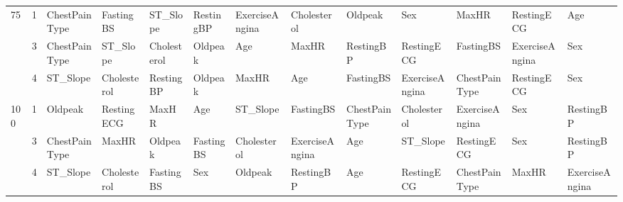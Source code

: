 \begin{table}[htbp]
\begin{tabular}{lllllllllllll}
\multirow[c]{3}{*}{75} & 1 & ChestPainType & FastingBS & ST_Slope & RestingBP & ExerciseAngina & Cholesterol & Oldpeak & Sex & MaxHR & RestingECG & Age \\
 & 3 & ChestPainType & ST_Slope & Cholesterol & Oldpeak & Age & MaxHR & RestingBP & RestingECG & FastingBS & ExerciseAngina & Sex \\
 & 4 & ST_Slope & Cholesterol & RestingBP & Oldpeak & MaxHR & Age & FastingBS & ExerciseAngina & ChestPainType & RestingECG & Sex \\
\multirow[c]{3}{*}{100} & 1 & Oldpeak & RestingECG & MaxHR & Age & ST_Slope & FastingBS & ChestPainType & Cholesterol & ExerciseAngina & Sex & RestingBP \\
 & 3 & ChestPainType & MaxHR & Oldpeak & FastingBS & Cholesterol & ExerciseAngina & Age & ST_Slope & RestingECG & Sex & RestingBP \\
 & 4 & ST_Slope & Cholesterol & FastingBS & Sex & Oldpeak & RestingBP & Age & RestingECG & ChestPainType & MaxHR & ExerciseAngina \\
\bottomrule
\end{tabular}
\end{table}
